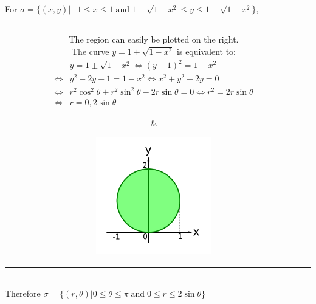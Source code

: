 \documentclass{article}
\newcommand{\dr}[1]{\textcolor{dark_red}{#1}}
\begin{document}
\dr{\begin{framed}
For \(\sigma = \{(x,y) | -1 \leq x \leq 1 \;\text{and}\; 1 - \sqrt{1 - x^2} \leq y \leq 1 + \sqrt{1 - x^2}\}\), \\
\begin{tabular}{cc}
\parbox{0.6\textwidth}{
The region can easily be plotted on the right. \\
The curve \(y = 1 \pm \sqrt{1 - x^2}\) is equivalent to:
\begin{align*}
& y = 1 \pm \sqrt{1 - x^2} 
\iff (y - 1)^2 = 1 - x^2 \\
\iff & y^2 - 2y + 1 = 1 - x^2 
\iff x^2 + y^2 - 2y = 0 \\
\iff & r^2\cos^2\theta + r^2\sin^2\theta - 2r\sin\theta = 0 
\iff r^2 = 2r\sin\theta \\
\iff & r = 0, 2\sin\theta
\end{align*} 
} & \parbox{0.4\textwidth}{
\includegraphics[width = 0.4\textwidth]{Test_bench_part_3x_images/Test_bench_part_3x_Solutions_image_6}
}
\end{tabular} \\
Therefore \(\sigma = \{(r,\theta) | 0 \leq \theta \leq \pi \;\text{and}\; 0 \leq r \leq 2\sin\theta\}\)
\end{framed}}

\pagebreak
\end{document}
